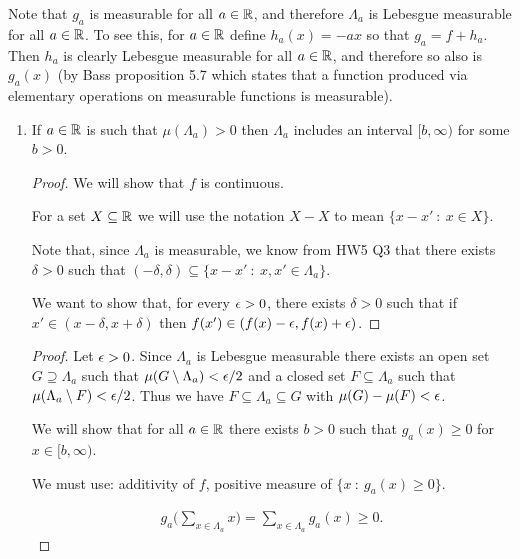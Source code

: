 Note that $g_a$ is measurable for all $a \in \mathbb{R}$, and therefore $\Lambda_a$ is Lebesgue measurable for
all $a \in \mathbb{R}$. To see this, for $a \in \mathbb{R}$ define $h_a(x) = -ax$ so that $g_a = f + h_a$. Then $h_a$ is
clearly Lebesgue measurable for all $a \in \mathbb{R}$, and therefore so also is $g_a(x)$ (by Bass proposition 5.7
which states that a function produced via elementary operations on measurable functions is measurable).

\begin{enumerate}
\item
  \begin{claim*}
    If $a \in \mathbb{R}$ is such that $\mu(\Lambda_a) > 0$ then $\Lambda_a$ includes an interval $[b, \infty)$ for some $b > 0$.
  \end{claim*}


  \begin{proof}
    We will show that $f$ is continuous.






    For a set $X \subseteq \mathbb{R}$ we will use the notation $X - X$ to mean $\{x - x' ~:~ x \in X \}$.

    Note that, since $\Lambda_a$ is measurable, we know from HW5 Q3 that there exists $\delta > 0$ such
    that $(-\delta, \delta) \subseteq \{x - x' ~:~ x, x' \in \Lambda_a \}$.

    We want to show that, for every $\epsilon > 0$, there exists $\delta > 0$ such that
    if $x' \in (x - \delta, x + \delta)$ then $f(x') \in (f(x) - \epsilon, f(x) + \epsilon)$.


  \end{proof}


  \begin{proof}
    Let $\epsilon > 0$. Since $\Lambda_a$ is Lebesgue measurable there exists an open set $G \supseteq \Lambda_a$
    such that $\mu(G \setminus \Lambda_a) < \epsilon/2$ and a closed set $F \subseteq \Lambda_a$ such
    that $\mu(\Lambda_a \setminus F) < \epsilon/2$. Thus we have $F \subseteq \Lambda_a \subseteq G$
    with $\mu(G) - \mu(F) < \epsilon$.

    We will show that for all $a \in \mathbb{R}$ there exists $b > 0$ such that $g_a(x) \geq 0$ for $x \in [b, \infty)$.

    We must use: additivity of $f$, positive measure of $\{x ~:~ g_a(x) \geq 0\}$.

    \begin{align*}
      g_a\Big(\sum_{x \in \Lambda_a} x\Big) = \sum_{x \in \Lambda_a} g_a(x) \geq 0.
    \end{align*}


\end{proof}
\end{enumerate}
